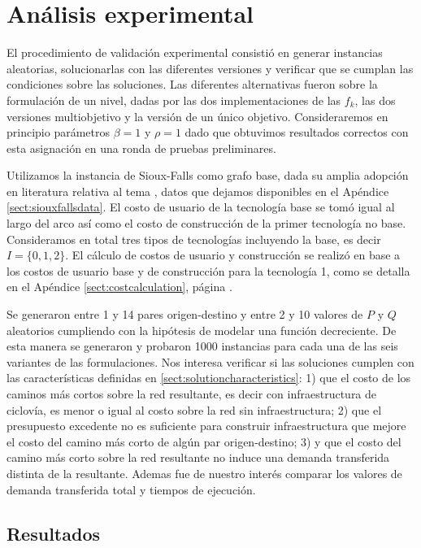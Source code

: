 \FloatBarrier
\section{Análisis experimental}

El procedimiento de validación experimental consistió en generar instancias aleatorias, solucionarlas con las diferentes versiones y verificar que se cumplan las condiciones sobre las soluciones. Las diferentes alternativas fueron sobre la formulación de un nivel, dadas por las dos implementaciones de las $f_k$, las dos versiones multiobjetivo y la versión de un único objetivo. Consideraremos en principio parámetros $\beta = 1$ y $\rho = 1$ dado que obtuvimos resultados correctos con esta asignación en una ronda de pruebas preliminares.

Utilizamos la instancia de Sioux-Falls como grafo base, dada su amplia adopción en literatura relativa al tema \cite{Liu2019}, datos que dejamos disponibles en el Apéndice \ref{sect:siouxfallsdata}. El costo de usuario de la tecnología base se tomó igual al largo del arco así como el costo de construcción de la primer tecnología no base. Consideramos en total tres tipos de tecnologías incluyendo la base, es decir $I = \{0, 1, 2\}$. El cálculo de costos de usuario y construcción se realizó en base a los costos de usuario base y de construcción para la tecnología 1, como se detalla en el Apéndice \ref{sect:costcalculation}, página \pageref{sect:costcalculation}.

Se generaron entre 1 y 14 pares origen-destino y entre 2 y 10 valores de $P$ y $Q$ aleatorios cumpliendo con la hipótesis de modelar una función decreciente.
De esta manera se generaron y probaron 1000 instancias para cada una de las seis variantes de las formulaciones. Nos interesa verificar si las soluciones cumplen con las características definidas en \ref{sect:solutioncharacteristics}: 1) que el costo de los caminos más cortos sobre la red resultante, es decir con infraestructura de ciclovía, es menor o igual al costo sobre la red sin infraestructura; 2) que el presupuesto excedente no es suficiente para construir infraestructura que mejore el costo del camino más corto de algún par origen-destino; 3) y que el costo del camino más corto sobre la red resultante no induce una demanda transferida distinta de la resultante. Ademas fue de nuestro interés comparar los valores de demanda transferida total y tiempos de ejecución.

\FloatBarrier
\subsection{Resultados}

